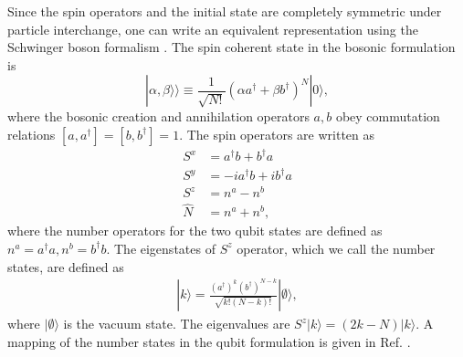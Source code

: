 \documentclass{WileyMSP-template}
\begin{document}
Since the spin operators and the initial state are completely symmetric under particle interchange, one can write an equivalent representation using the Schwinger boson formalism \cite{byrnes2020quantum}.  The spin coherent state in the bosonic formulation is
%
\begin{equation}
\label{becqubit}
|\alpha,\beta\rangle\rangle\equiv\frac{1}{\sqrt{N!}}(\alpha a^\dagger+\beta b^\dagger)^{N}|0\rangle,
\end{equation}
%
where the bosonic creation and annihilation operators $ a, b $ obey commutation relations $[a,a^\dagger]=[b,b^\dagger]=1$. The spin operators are written as
%
\begin{align}
S^x & = a^\dagger b + b^\dagger a \nonumber \\
S^y & = -i a^\dagger b + i b^\dagger a \nonumber \\
S^z & = n^a - n^b \nonumber \\
\hat{N} & = n^a + n^b ,
\end{align}
%
where the number operators for the two qubit states are defined as $ n^a = a^\dagger a, n^b = b^\dagger b $.  The eigenstates of $ S^z $ operator, which we call the number states, are defined as
%
\begin{align}
| k \rangle = \frac{ (a^\dagger)^k (b^\dagger)^{N-k} }{\sqrt{k! (N-k)!}} | \emptyset \rangle ,
\end{align}
%
where $ | \emptyset \rangle $ is the vacuum state.  The eigenvalues are $ S^z |k \rangle = (2k - N) | k \rangle $. A mapping of the number states in the qubit formulation is given in Ref. \cite{byrnes2023multipartite}.



\end{document}
